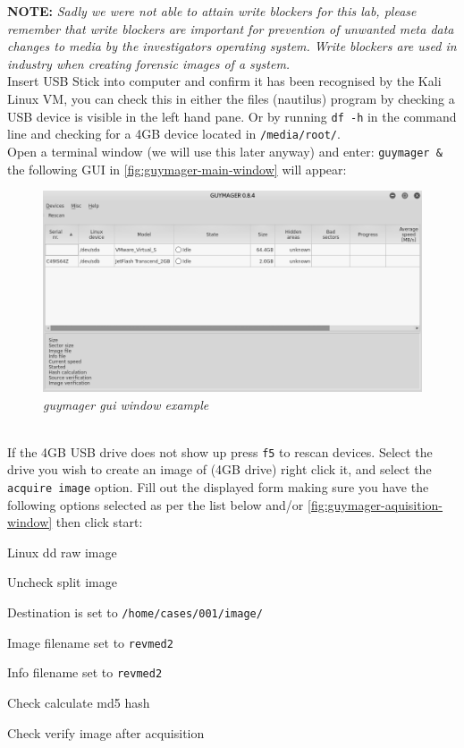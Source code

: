 \documentclass[a4paper,11pt]{article}
\begin{document}
\textbf{NOTE:} \textit{Sadly we were not able to attain write blockers for this lab, please remember that write blockers are important for prevention of unwanted meta data changes to media by the investigators operating system. Write blockers are used in industry when creating forensic images of a system.}\\

Insert USB Stick into computer and confirm it has been recognised by the Kali Linux VM, you can check this in either the files (nautilus) program by checking a USB device is visible in the left hand pane. Or by running \texttt{df -h} in the command line and checking for a 4GB device located in \texttt{/media/root/}. \\

Open a terminal window (we will use this later anyway) and enter: \texttt{{guymager {\&}}} the following GUI in \autoref{fig:guymager-main-window} will appear:
\begin{figure}[h]
	\centering
	\includegraphics[scale=0.5]{guymager-window}
	\caption{\textit{guymager gui window example}}
	\label{fig:guymager-main-window}
\end{figure}
\\
If the 4GB USB drive does not show up press \texttt{f5} to rescan devices.  Select the drive you wish to create an image of (4GB drive) right click it, and select the \texttt{acquire image} option. Fill out the displayed form making sure you have the following options selected as per the list below and/or \autoref{fig:guymager-aquisition-window} then click start:
\begin{itemize*}
\item Linux dd raw image
\item Uncheck split image
\item Destination is set to \texttt{/home/cases/001/image/}
\item Image filename set to \texttt{revmed2}
\item Info filename set to \texttt{revmed2}
\item Check calculate md5 hash
\item Check verify image after acquisition
\end{itemize*}
\end{document}
